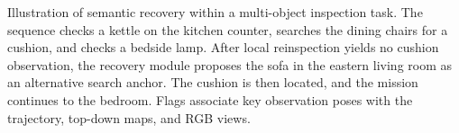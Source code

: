 \caption{Illustration of semantic recovery within a multi-object inspection task. The sequence checks a kettle on the kitchen counter, searches the dining chairs for a cushion, and checks a bedside lamp. After local reinspection yields no cushion observation, the recovery module proposes the sofa in the eastern living room as an alternative search anchor. The cushion is then located, and the mission continues to the bedroom. Flags associate key observation poses with the trajectory, top-down maps, and RGB views.}

